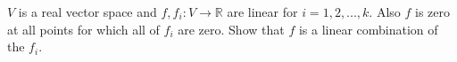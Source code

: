$V$ is a real vector space and $ f,  f_{i}: V \rightarrow \mathbb{R} $ are linear for $i = 1, 2, ... , k.$  Also $f $ is zero at all points for which all of $ f_{i }$ are zero. Show that $ f $ is a linear combination of the $f_{i}$.